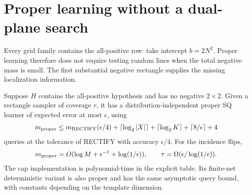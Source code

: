 \section{Proper learning without a dual-plane search}\label{sec:proper}
Every grid family contains the all-positive row: take intercept $b=2N^2$. Proper learning therefore does not require testing random lines when the total negative mass is small. The first substantial negative rectangle supplies the missing localization information.

\begin{samepage}
\begin{theorem}\label{thm:proper}
Suppose $H$ contains the all-positive hypothesis and has no negative $2\times2$. Given a rectangle sampler of coverage $r$, it has a distribution-independent proper SQ learner of expected error at most $\epsilon$, using
\begin{equation}\label{eq:propercomplexity}
 m_{\rm proper}\le m_{\rm RECTIFY}(\epsilon/4)
 +\lceil\log_2|X|\rceil+\lceil\log_2K\rceil
 +\lceil8/\epsilon\rceil+4
\end{equation}
queries at the tolerance of RECTIFY with accuracy $\epsilon/4$. For the incidence flips,
\[
 m_{\rm proper}=O(\log M+\epsilon^{-1}+\log(1/\epsilon)),\qquad
 \tau=\Omega(\epsilon/\log(1/\epsilon)).
\]
The cap implementation is polynomial-time in the explicit table. Its finite-net deterministic variant is also proper and has the same asymptotic query bound, with constants depending on the template dimension.
\end{theorem}
\end{samepage}
\begin{center}\end{center}
